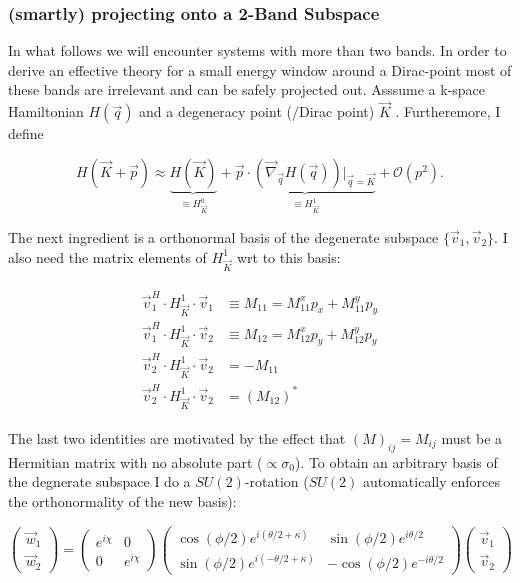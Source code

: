 \documentclass[../../../main.tex]{subfiles}
\begin{document}
\subsubsection{(smartly) projecting onto a 2-Band Subspace}

In what follows we will encounter systems with more than two bands. In order to derive an effective theory for a small energy window around a Dirac-point most of these bands are irrelevant and can be safely projected out. Asssume a k-space Hamiltonian $H(\vec{q})$ and a degeneracy point (/Dirac point) $\vec{K}$ .  Furtheremore, I define

\begin{equation}
	H(\vec{K}+ \vec{p}) \approx \underbrace{H(\vec{K})}_{\equiv H_{\vec{K}}^0} + \underbrace{\vec{p} \cdot \left(\vec{\nabla}_{\vec{q}}H(\vec{q})\right)\bigg\rvert_{\vec{q} = \vec{K}}}_{\equiv H_{\vec{K}}^1} + \mathcal{O}(p^2).
\end{equation}

The next ingredient is a orthonormal basis of the degenerate subspace $\{ \vec{v}_1, \vec{v}_2 \}$. I also need the matrix elements of $H_{\vec{K}}^1$ wrt to this basis:

\begin{align}
	\begin{split}
		\vec{v}_1^H \cdot H_{\vec{K}}^1 \cdot \vec{v}_1 &\equiv M_{11} = M_{11}^x p_x + M_{11}^y p_y \\
		\vec{v}_1^H \cdot H_{\vec{K}}^1 \cdot \vec{v}_2 &\equiv M_{12} = M_{12}^x p_y + M_{12}^y p_y \\
		\vec{v}_2^H \cdot H_{\vec{K}}^1 \cdot \vec{v}_2 &= -M_{11} \\
		\vec{v}_2^H \cdot H_{\vec{K}}^1 \cdot \vec{v}_2 &= (M_{12})^*
	\end{split}
\end{align}


The last two identities are motivated by the effect that $(M)_{ij} = M_{ij}$ must be a Hermitian matrix with no absolute part ($\propto \sigma_0$). To obtain an arbitrary basis of the degnerate subspace I do a $SU(2)$-rotation ($SU(2)$ automatically enforces the orthonormality of the new basis):

\begin{equation}
	\begin{pmatrix}
		\vec{w}_1 \\
		\vec{w}_2
	\end{pmatrix} = 
	\begin{pmatrix}
		e^{i\chi} & 0 \\
		0 & e^{i\chi}
	\end{pmatrix}
	\begin{pmatrix}
		\cos(\phi/2)e^{i(\theta/2+\kappa)} & \sin(\phi/2) e^{i\theta/2}\\
		\sin(\phi/2)e^{i(-\theta/2+\kappa)} & -\cos(\phi/2)e^{-i\theta/2}
	\end{pmatrix}
	\begin{pmatrix}
		\vec{v}_1 \\
		\vec{v}_2
	\end{pmatrix}
\end{equation}
\end{document}
